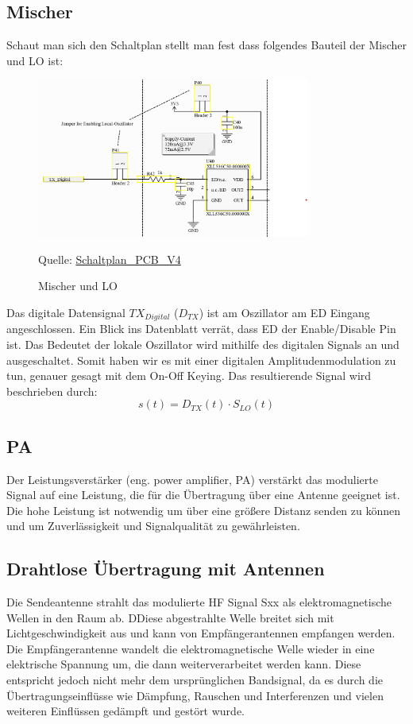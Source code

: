 \subsection{Mischer}
Schaut man sich den Schaltplan stellt man fest dass folgendes Bauteil der Mischer und LO ist:
\begin{figure}[H]
    \centering
    \includegraphics[width=0.8\textwidth]{Pictures/MischerLO.png}
    \caption{Mischer und LO}
    \footnotesize{Quelle: \url{Schaltplan_PCB_V4}}
    \label{fig:link_budget}
\end{figure}
Das digitale Datensignal $TX_{Digital}$ ($D_{TX}$) ist am Oszillator am ED Eingang angeschlossen.
Ein Blick ins Datenblatt verrät, dass ED der Enable/Disable Pin ist.
Das Bedeutet der lokale Oszillator wird mithilfe des digitalen Signals an und ausgeschaltet.
Somit haben wir es mit einer digitalen Amplitudenmodulation zu tun, genauer gesagt mit dem
On-Off Keying. Das resultierende Signal wird beschrieben durch:
\begin{equation}
    s(t) = D_{TX}(t)\cdot S_{LO}(t)
\end{equation}





\subsection{PA}
Der Leistungsverstärker (eng. power amplifier, PA) verstärkt das modulierte Signal auf eine Leistung, die für die Übertragung über eine Antenne 
geeignet ist. Die hohe Leistung ist notwendig um über eine größere Distanz senden zu können und um Zuverlässigkeit und
Signalqualität zu gewährleisten. 

\subsection{Drahtlose Übertragung mit Antennen}
Die Sendeantenne strahlt das modulierte HF Signal Sxx als elektromagnetische Wellen in den Raum ab. DDiese abgestrahlte Welle
breitet sich mit Lichtgeschwindigkeit aus und kann von Empfängerantennen empfangen werden. Die Empfängerantenne wandelt
die elektromagnetische Welle wieder in eine elektrische Spannung um, die dann weiterverarbeitet werden kann. Diese entspricht
jedoch nicht mehr dem ursprünglichen Bandsignal, da es durch die Übertragungseinflüsse wie Dämpfung, Rauschen und Interferenzen
und vielen weiteren Einflüssen gedämpft und gestört wurde.

